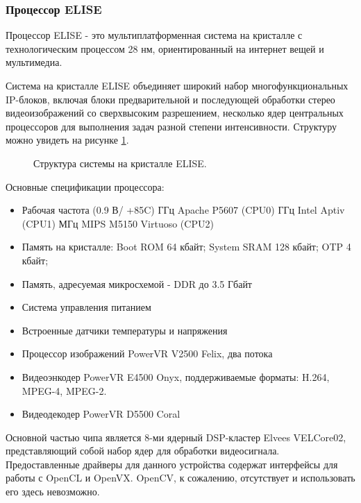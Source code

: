 \documentclass[14pt,a4paper]{scrartcl}
\begin{document}
		\subsubsection{Процессор ELISE}
		
			Процессор ELISE - это мультиплатформенная система на кристалле с технологическим процессом 28 нм, ориентированный на интернет вещей и мультимедиа.
			
			Система на кристалле ELISE объединяет широкий набор многофункциональных IP-блоков, включая блоки предварительной и последующей обработки стерео видеоизображений со сверхвысоким разрешением, несколько ядер центральных процессоров для выполнения задач разной степени интенсивности. Структуру можно увидеть на рисунке \ref{fig:Elise_Scheme}\cite{bib:Elise_CPU_Desc}.
			
			\begin{figure}[h]
				\caption{Структура системы на кристалле ELISE.}
				\label{fig:Elise_Scheme}
			\end{figure}
			
			Основные спецификации процессора:
			
			\begin{itemize}
				\item Рабочая частота (0.9 В/ +85\textdegree{}C)
					 ГГц Apache P5607 (CPU0)
					 ГГц Intel Aptiv (CPU1)
					 МГц MIPS M5150 Virtuoso (CPU2)
				\item Память на кристалле: Boot ROM 64 кбайт; System SRAM 128 кбайт; OTP 4 кбайт;
				\item Память, адресуемая микросхемой - DDR до 3.5 Гбайт
				\item Система управления питанием
				\item Встроенные датчики температуры и напряжения
				\item Процессор изображений PowerVR V2500 Felix, два потока
				\item Видеоэнкодер PowerVR E4500 Onyx, поддерживаемые форматы: H.264, MPEG-4, MPEG-2.
				\item Видеодекодер PowerVR D5500 Coral
			\end{itemize}
		
			Основной частью чипа является 8-ми ядерный DSP-кластер Elvees VELCore02, представляющий собой набор ядер для обработки видеосигнала. Предоставленные драйверы для данного устройства содержат интерфейсы для работы с OpenCL и OpenVX. OpenCV, к сожалению, отсутствует и использовать его здесь невозможно.
		
\end{document}

